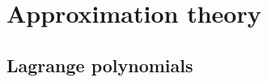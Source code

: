 \section{Approximation theory}\label{sec:approximation_theory}
\subsection{Lagrange polynomials}\label{subsec:lagrange_polynomials}
